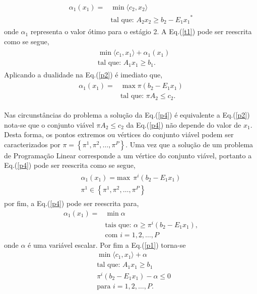\documentclass[12pt,fleqn]{article}
\begin{document}
\begin{align}
  \begin{split}	
	\alpha_{1} (x_1) =& \min \langle c_2,x_2\rangle \\
	&\mbox{tal que: }A_2 x_2 \geq b_2 - {E_1 x_1}^{*} 
  \end{split}
    \label{p3}
\end{align}
onde ${\alpha}_{1}$ representa o valor \'otimo para o est\'agio 2. A Eq.(\ref{t1}) pode ser reescrita como se segue,
\begin{align}
  \begin{split}	
  &\min \langle c_1,x_1\rangle + {\alpha}_{1}(x_1) \\
&\mbox{tal que: }	A_1x_1 \geq b_1.
\end{split}
  \end{align}
Aplicando a dualidade na Eq.(\ref{p2}) \'e imediato que,
\begin{align}
  \begin{split}	
 \alpha_{1}(x_1) = &\max \pi (b_2 - E_1x_1 ) \\
	&\mbox{tal que: }\pi A_2  \leq c_2.
  \end{split}
 	\label{p4}
\end{align}

Nas circunst\^ancias do problema a solu\c c\~ao da Eq.(\ref{p4}) \'e equivalente a Eq.(\ref{p2})
nota-se que o conjunto vi\'avel $\pi A_2 \leq c_2$ da Eq.(\ref{p4}) n\~ao depende do valor de $x_1$. Desta forma, os
pontos extremos ou v\'ertices do conjunto vi\'avel podem ser caracterizados por $\pi = \left\{ \pi^1, \pi^2, \dots,
\pi^P \right\}$. Uma vez
que a solu\c c\~ao de um problema de Programa\c c\~ao Linear corresponde  a um v\'ertice do conjunto vi\'avel,
portanto a Eq.(\ref{p4}) pode ser reescrita como se segue,
\begin{align*}
  \begin{aligned}
	{\alpha}_{1}(x_1) = \text {max} \ \ {\pi}^{i} (b_2 - E_1x_1) \\
	{\pi}^{1} \in \left\{ {\pi}^{1}, {\pi}^{2},\dots, {\pi}^{P} \right\}
  \end{aligned}
	\label{p5}
\end{align*}
por fim, a Eq.(\ref{p4}) pode ser reescrita para, 
\begin{align*}
  	\alpha_{1}(x_1) =& \min\alpha \nonumber\\ 
	&\mbox{tais que: }\alpha \geq \pi^{i}(b_2 - E_1 x_1),\nonumber\\ &\mbox{com } i = 1,2, \dots , P
	\label{p6}
\end{align*}
onde $\alpha$ \'e uma vari\'avel escalar. Por fim a Eq.(\ref{p1}) torna-se
\begin{align*}
&\min \langle c_1,x_1\rangle + \alpha \nonumber\\
&\mbox{tal que: }	A_1 x_1 \geq b_1 \nonumber\\
&	\pi^{i}(b_2 - E_1x_1) - \alpha \leq 0\nonumber \\ 
&\mbox{para }	i = 1, 2, \dots , P.
	\label{p7}
\end{align*}
\end{document}
